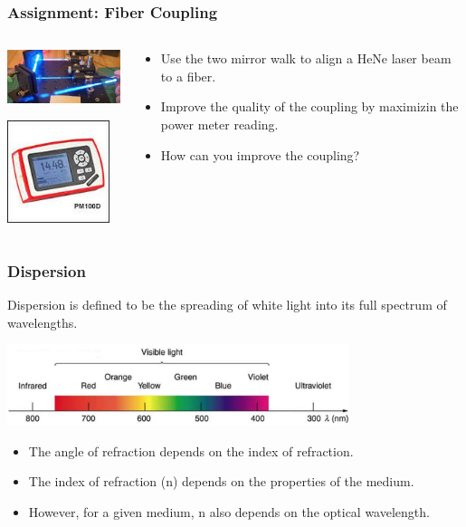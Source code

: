 \documentclass{beamer}
\begin{document}
\begin{frame}\frametitle{Assignment: Fiber Coupling}
\begin{columns}
\begin{column}{4.5cm}
\begin{center}
\includegraphics[width=4.5cm]{fig/coupling.jpg}

\vspace{1cm}

\includegraphics[width=3cm]{fig/pm100d.jpg}

\end{center}
\end{column}
\begin{column}{6.5cm}
\begin{itemize}
\item Use the two mirror walk to align a HeNe laser beam to a fiber.
\item Improve the quality of the coupling by maximizin the power meter reading.
\item How can you improve the coupling? 
\end{itemize}


\end{column}
\end{columns}

\end{frame}



\begin{frame}\frametitle{Dispersion}
Dispersion is defined to be the spreading of white light into its full spectrum of wavelengths.

\begin{center}
\includegraphics[width=10cm]{fig/rainbow.jpg}
\end{center}

\begin{itemize}
\item The angle of refraction depends on the index of refraction.
\item The index of refraction (n) depends on the properties of the medium.
\item However, for a given medium, n also depends on the optical wavelength.
\end{itemize}


\end{frame}
\end{document}
